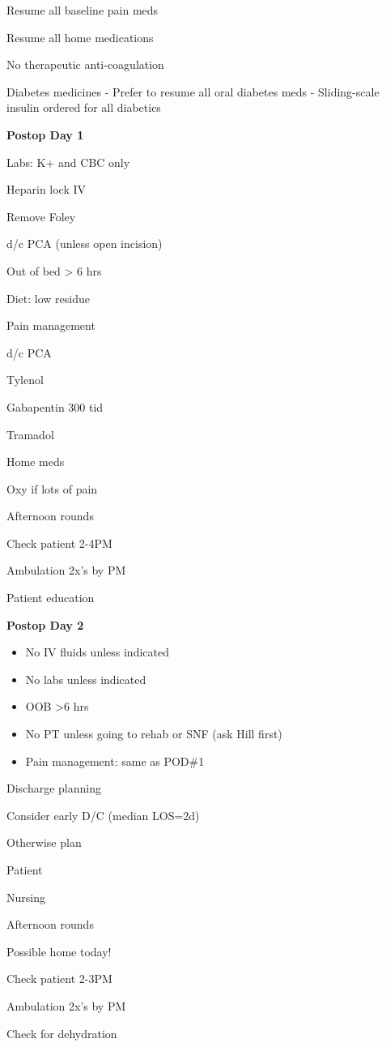 \documentclass[
  letterpaper,
]{scrbook}
\providecommand{\tightlist}{%
  \setlength{\itemsep}{0pt}\setlength{\parskip}{0pt}}
\begin{document}
Resume all baseline pain meds

Resume all home medications

No therapeutic anti-coagulation

Diabetes medicines - Prefer to resume all oral diabetes meds -
Sliding-scale insulin ordered for all diabetics

\textbf{Postop Day 1}

Labs: K+ and CBC only

Heparin lock IV

Remove Foley

d/c PCA (unless open incision)

Out of bed \textgreater{} 6 hrs

Diet: low residue

Pain management

d/c PCA

Tylenol

Gabapentin 300 tid

Tramadol

Home meds

Oxy if lots of pain

Afternoon rounds

Check patient 2-4PM

Ambulation 2x's by PM

Patient education

\textbf{Postop Day 2}

\begin{itemize}
\tightlist
\item
  No IV fluids unless indicated
\item
  No labs unless indicated
\item
  OOB \textgreater6 hrs
\item
  No PT unless going to rehab or SNF (ask Hill first)
\item
  Pain management: same as POD\#1
\end{itemize}

Discharge planning

Consider early D/C (median LOS=2d)

Otherwise plan

Patient

Nursing

Afternoon rounds

Possible home today!

Check patient 2-3PM

Ambulation 2x's by PM

Check for dehydration
\end{document}
